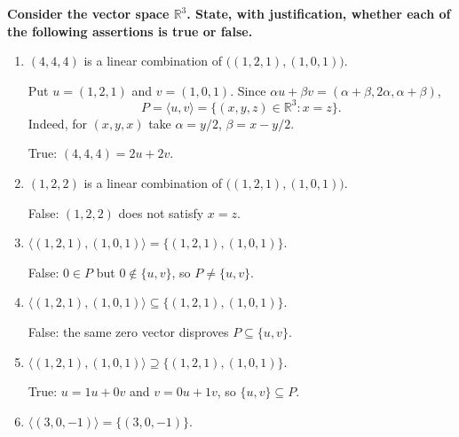 \providecommand{\rank}{\operatorname{r}}
\providecommand{\RR}{\mathbb R}
\providecommand{\CC}{\mathbb C}
\providecommand{\KK}{\mathbb K}

\setcounter{enumi}{70}
\item {\bfseries\boldmath
Consider the vector space $\RR^3$. State, with justification, whether each of the following assertions is true or false.
}

\begin{enumerate}[label=\alph*)]

\item $(4,4,4)$ is a linear combination of $\bigl((1,2,1),(1,0,1)\bigr)$.

\begin{answer}
Put $u=(1,2,1)$ and $v=(1,0,1)$. Since
$\alpha u+\beta v=(\alpha+\beta,2\alpha,\alpha+\beta)$,
\[
 P=\langle u,v\rangle=\{(x,y,z)\in\RR^3:x=z\}.
\]
Indeed, for $(x,y,x)$ take $\alpha=y/2$, $\beta=x-y/2$.

True: $(4,4,4)=2u+2v$.
\end{answer}

\item $(1,2,2)$ is a linear combination of $\bigl((1,2,1),(1,0,1)\bigr)$.

\begin{answer}
False: $(1,2,2)$ does not satisfy $x=z$.
\end{answer}

\item $\langle(1,2,1),(1,0,1)\rangle=\{(1,2,1),(1,0,1)\}$.

\begin{answer}
False: $0\in P$ but $0\notin\{u,v\}$, so $P\ne\{u,v\}$.
\end{answer}

\item $\langle(1,2,1),(1,0,1)\rangle\subseteq\{(1,2,1),(1,0,1)\}$.

\begin{answer}
False: the same zero vector disproves $P\subseteq\{u,v\}$.
\end{answer}

\item $\langle(1,2,1),(1,0,1)\rangle\supseteq\{(1,2,1),(1,0,1)\}$.

\begin{answer}
True: $u=1u+0v$ and $v=0u+1v$, so $\{u,v\}\subseteq P$.
\end{answer}

\item $\langle(3,0,-1)\rangle=\{(3,0,-1)\}$.


\end{enumerate}

